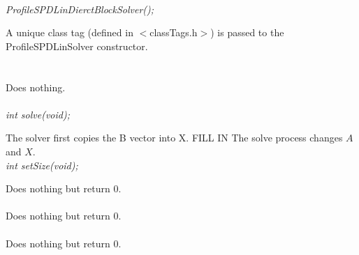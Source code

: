   \\
{\em ProfileSPDLinDierctBlockSolver();}  

A unique class tag (defined in $<$classTags.h$>$) is passed to the
ProfileSPDLinSolver constructor. \\


 \\
\\ 
Does nothing. \\

  \\
{\em int solve(void);} 

The solver first copies the B vector into X.
FILL IN
The solve process changes $A$ and $X$. \\   


{\em int setSize(void);} 

Does nothing but return $0$. \\

 \\ 
Does nothing but return $0$. \\

 \\ 
Does nothing but return $0$. \\







